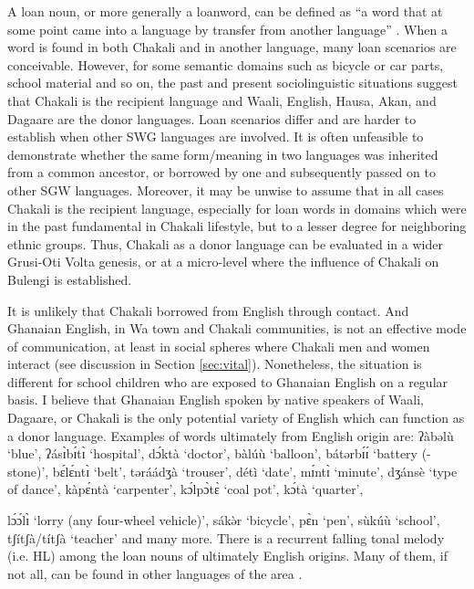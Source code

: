 \begin{exe}
\begin{exe}
\begin{exe}
{\begin{exe}
\begin{exe}
\begin{exe}
\begin{exe}
\begin{exe}
\begin{exe}
 A loan noun,  or more generally a loanword, can be defined as  ``a word that at
some point came into a language by transfer from another language''
\citep[58]{Hasp08}.  When a word is found in both Chakali and in another
language, many loan scenarios are conceivable. However,  for some semantic
domains such as   bicycle or car parts, school material and so on, the past and
present sociolinguistic situations  suggest that Chakali is
the recipient language and Waali, English, Hausa, Akan, and Dagaare are the
donor
languages.  Loan scenarios differ and are harder to establish when other SWG
languages are involved. It is often unfeasible to demonstrate whether the same
form/meaning in two languages was inherited from a common ancestor, or  
borrowed by one and subsequently passed on to other SGW languages. Moreover, it
may be unwise to assume that in all cases Chakali is  the recipient language,
especially for loan words in domains which  were in the past fundamental in
Chakali lifestyle,  but to a lesser degree for neighboring ethnic groups. 
Thus, Chakali as a donor language can be evaluated in a wider Grusi-Oti Volta
genesis, or  at a micro-level where the influence of Chakali on Bulengi is
established.

It is unlikely that Chakali borrowed from English through contact. And Ghanaian
English, in Wa town and Chakali communities,  is not an effective mode of
communication, at least in social spheres where Chakali men and women 
interact (see discussion in Section \ref{sec:vital}).  Nonetheless, the
situation is different for school children  who are
exposed to Ghanaian English on a regular basis. I believe that Ghanaian English
spoken by native speakers of Waali, Dagaare, or Chakali  is the only potential
variety of English which can function as a donor language. Examples of words 
ultimately  from English origin are: {\sls ʔàbəlù} `blue', {\sls 
ʔásɪ̀bɪ́tɪ̀} 
`hospital', {\sls dɔ́ktà} `doctor', {\sls bàlúù} `balloon', {\sls 
bátərbɪ́ɪ́} 
`battery (-stone)', {\sls bɛ́lɛ́ntɪ̀} `belt',  {\sls təráádʒà} `trouser',  
{\sls 
détì} `date', {\sls mɪ́ntɪ̀} `minute',   {\sls dʒánsè} `type of dance',  
{\sls 
kàpɛ́ntà} `carpenter', {\sls kɔ́lpɔ̀tɛ̀} `coal pot', {\sls kɔ́tà} `quarter', 
 
{\sls 
lɔ́ɔ́lɪ̀} `lorry (any four-wheel vehicle)',   {\sls sákə̀r} `bicycle',  {\sls 
pɛ̀n} 
`pen', {\sls sùkúù} `school',   {\sls tʃítʃà/títʃà} `teacher' and many 
more.  
There 
is a recurrent falling tonal melody (i.e. HL) among the loan nouns of  
ultimately English origins. Many of them,  if not all, can be found in other 
languages of the area \citep{sisa75, daku07}. 


\end{exe}
\end{exe}
\end{exe}
\end{exe}
\end{exe}
\end{exe}}
\end{exe}
\end{exe}
\end{exe}
